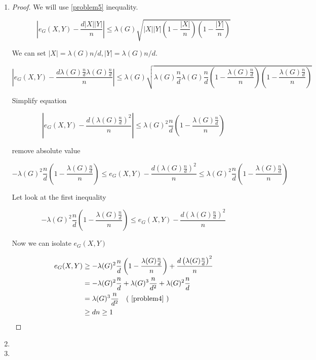 \documentclass[a4paper, 11pt, oneside]{article}
\newcommand\abs[1]{\left|#1\right|}
\begin{document}
 \begin{enumerate}
 \item
 \begin{proof}
 We will use \ref{problem5} inequality.

\begin{equation*}
\left\lvert  e_G(X,Y) - \frac{d\abs{X}\abs{Y}}{n} \right\rvert \leq \lambda(G) \sqrt{  \abs{X}\abs{Y}  \left( 1 - \frac{\abs{X}}{n} \right)\left( 1 - \frac{\abs{Y}}{n} \right)} 
\end{equation*}	
   
We can set $\abs{X} = \lambda(G)n/d,\abs{Y} = \lambda(G)n/d$.
  
 \begin{equation*}
\left\lvert  e_G(X,Y) - \frac{d\lambda(G)\frac{n}{d}\lambda(G)\frac{n}{d}}{n} \right\rvert \leq \lambda(G) \sqrt{  \lambda(G)\frac{n}{d}\lambda(G)\frac{n}{d}  \left( 1 - \frac{\lambda(G)\frac{n}{d}}{n} \right)\left( 1 - \frac{\lambda(G)\frac{n}{d}}{n} \right)} 
\end{equation*}	

Simplify equation

 \begin{equation*}
\left\lvert  e_G(X,Y) - \frac{d\left(\lambda(G)\frac{n}{d}\right)^2}{n} \right\rvert \leq \lambda(G)^2\frac{n}{d}\left( 1 - \frac{\lambda(G)\frac{n}{d}}{n} \right)
\end{equation*}	

remove absolute value 

\begin{equation*}
-\lambda(G)^2\frac{n}{d}\left( 1 - \frac{\lambda(G)\frac{n}{d}}{n} \right) \leq  e_G(X,Y) - \frac{d\left(\lambda(G)\frac{n}{d}\right)^2}{n} \leq \lambda(G)^2\frac{n}{d}\left( 1 - \frac{\lambda(G)\frac{n}{d}}{n} \right)
\end{equation*}	

Let look at the first inequality

\begin{equation*}
-\lambda(G)^2\frac{n}{d}\left( 1 - \frac{\lambda(G)\frac{n}{d}}{n} \right) \leq  e_G(X,Y) - \frac{d\left(\lambda(G)\frac{n}{d}\right)^2}{n}
\end{equation*}	

Now we can isolate $e_G(X,Y)$

\begin{align*}
e_G(X,Y) & \geq
-\lambda(G)^2\frac{n}{d}\left( 1 - \frac{\lambda(G)\frac{n}{d}}{n} \right) + \frac{d\left(\lambda(G)\frac{n}{d}\right)^2}{n}   \\ &=
-\lambda(G)^2\frac{n}{d} + \lambda(G)^3 \frac{n}{d^2} + \lambda(G)^2 \frac{n}{d} \\&=
 \lambda(G)^3 \frac{n}{d^2} \quad\text{( \ref{problem4} )}  \\&\geq
 d n \geq 1
\end{align*}	
\end{proof}
 \item
 
 \item
 \end{enumerate}
		
\end{document}
